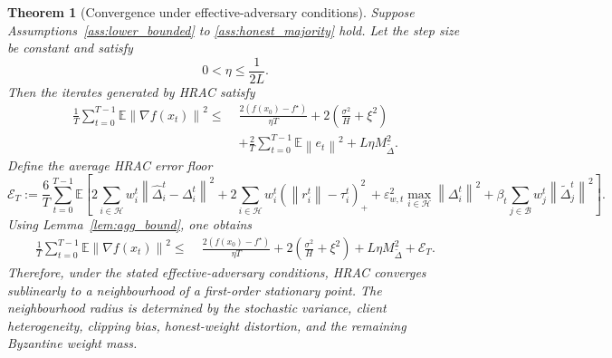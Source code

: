 \documentclass[11pt,a4paper]{article}
\newtheorem{theorem}{Theorem}
\theoremstyle{remark}
\newcommand{\E}{\mathbb{E}}
\newcommand{\HH}{\mathcal{H}}
\newcommand{\BB}{\mathcal{B}}
\newcommand{\norm}[1]{\left\lVert #1 \right\rVert}
\begin{document}
\begin{theorem}[Convergence under effective-adversary conditions]
\label{thm:main}
Suppose Assumptions~\ref{ass:lower_bounded} to \ref{ass:honest_majority} hold.
Let the step size be constant and satisfy
\begin{equation}
    0 < \eta \le \frac{1}{2L}.
    \label{eq:stepsize}
\end{equation}
Then the iterates generated by HRAC satisfy
\begin{align}
    \frac{1}{T}\sum_{t=0}^{T-1}\E\norm{\nabla f(x_t)}^2
    \le\;&
    \frac{2(f(x_0)-f^\star)}{\eta T}
    +
    2\left(\frac{\sigma^2}{H}+\xi^2\right)
    \nonumber\\
    &+
    \frac{2}{T}\sum_{t=0}^{T-1}\E\norm{e_t}^2
    +
    L\eta M_{\tilde\Delta}^2.
    \label{eq:main_pre}
\end{align}
Define the average HRAC error floor
\[
    \mathcal{E}_T
    :=
    \frac{6}{T}\sum_{t=0}^{T-1}\E\!\left[
        2\sum_{i\in\HH} w_i^t \norm{\hat{\Delta}_i^t-\Delta_i^t}^2
        +2\sum_{i\in\HH} w_i^t(\norm{r_i^t}-\tau_i^t)_+^2
        +\varepsilon_{w,t}^2 \max_{i\in\HH}\norm{\Delta_i^t}^2
        +\beta_t \sum_{j\in\BB} w_j^t \norm{\tilde{\Delta}_j^t}^2
    \right].
\]
Using Lemma~\ref{lem:agg_bound}, one obtains
\begin{align}
    \frac{1}{T}\sum_{t=0}^{T-1}\E\norm{\nabla f(x_t)}^2
    \le\;&
    \frac{2(f(x_0)-f^\star)}{\eta T}
    +
    2\left(\frac{\sigma^2}{H}+\xi^2\right)
    +
    L\eta M_{\tilde\Delta}^2
    +
    \mathcal{E}_T.
    \label{eq:main_full}
\end{align}
Therefore, under the stated effective-adversary conditions, HRAC converges
sublinearly to a neighbourhood of a
first-order stationary point.
The neighbourhood radius is determined by the stochastic variance,
client heterogeneity, clipping bias, honest-weight distortion, and the
remaining Byzantine weight mass.
\end{theorem}
\end{document}
